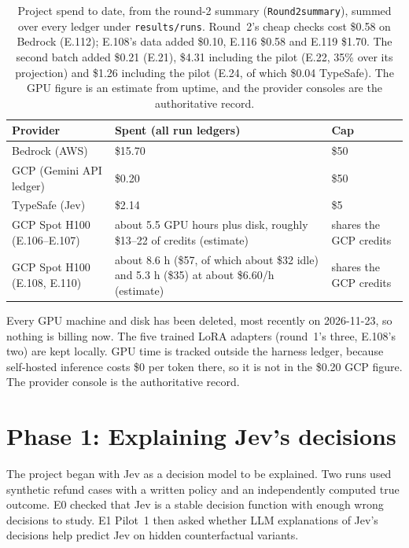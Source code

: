 \documentclass[11pt]{article}
\renewcommand{\_}{\origunderscore\allowbreak}
\begin{document}
\begin{table}[H]
\centering
\small
\begin{tabularx}{\textwidth}{@{}p{3.6cm}Xp{2.2cm}@{}}
\toprule
Provider & Spent (all run ledgers) & Cap \\
\midrule
Bedrock (AWS) & \$15.70 & \$50 \\
GCP (Gemini API ledger) & \$0.20 & \$50 \\
TypeSafe (Jev) & \$2.14 & \$5 \\
GCP Spot H100 (E.106--E.107) & about 5.5 GPU hours plus disk, roughly \$13--22 of credits (estimate) & shares the GCP credits \\
GCP Spot H100 (E.108, E.110) & about 8.6 h (\$57, of which about \$32 idle) and 5.3 h (\$35) at about \$6.60/h (estimate) & shares the GCP credits \\
\bottomrule
\end{tabularx}
\caption{Project spend to date, from the round-2 summary (\texttt{Round2\_summary}), summed over every ledger under \texttt{results/runs}. Round~2's cheap checks cost \$0.58 on Bedrock (E.112); E.108's data added \$0.10, E.116 \$0.58 and E.119 \$1.70. The second batch added \$0.21 (E.21), \$4.31 including the pilot (E.22, 35\% over its projection) and \$1.26 including the pilot (E.24, of which \$0.04 TypeSafe). The GPU figure is an estimate from uptime, and the provider consoles are the authoritative record.}
\label{tab:intro-budget}
\end{table}

Every GPU machine and disk has been deleted, most recently on 2026-11-23, so nothing is billing now. The five trained LoRA adapters (round~1's three, E.108's two) are kept locally. GPU time is tracked outside the harness ledger, because self-hosted inference costs \$0 per token there, so it is not in the \$0.20 GCP figure. The provider console is the authoritative record.

\section{Phase 1: Explaining Jev's decisions}\label{sec:phase1}

The project began with Jev as a decision model to be explained. Two runs used synthetic refund cases with a written policy and an independently computed true outcome. E0 checked that Jev is a stable decision function with enough wrong decisions to study. E1 Pilot~1 then asked whether LLM explanations of Jev's decisions help predict Jev on hidden counterfactual variants.
\end{document}
